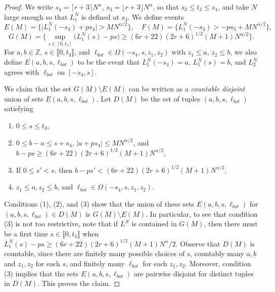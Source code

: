 \begin{proof}
	We write $s_4 = \lceil r+3 \rceil N^\alpha$, $s_3 = \lfloor r+3 \rfloor N^\alpha$, so that $s_3 \leq t_3 \leq s_4$, and take $N$ large enough so that $L_1^N$ is defined at $s_4$. We define events 
	\[
	E(M) = \Big\{\big|L_1^N(-s_4) + ps_4\big| > MN^{\alpha/2}\Big\}, \quad F(M) = \Big\{L_1^N(-s_3) > -ps_3 + MN^{\alpha/2} \Big\},
	\]
	\[
	G(M) = \Bigg\{\sup_{s\in[0,t_3]} \big(L_1^N(s) - ps \big) \geq (6r+22)(2r+6)^{1/2}(M+1)N^{\alpha/2} \Bigg\}.
	\]
	For $a,b\in\mathbb{Z}$, $s\in\llbracket 0, t_3 \rrbracket$, and $\ell_{bot}\in\Omega(-s_4,s,z_1,z_2)$ with $z_1\leq a$, $z_2\leq b$, we also define $E(a,b,s,\ell_{bot})$ to be the event that $L_1^N(-s_4) = a$, $L_1^N(s) = b$, and $L_2^N$ agrees with $\ell_{bot}$ on $[-s_4,s]$. 
	
	We claim that the set $G(M) \setminus E(M)$ can be written as a \textit{countable disjoint} union of sets $E(a,b,s,\ell_{bot})$. Let $D(M)$ be the set of tuples $(a,b,s,\ell_{bot})$ satisfying
	\begin{enumerate}[label=(\arabic*)]
		
		\item $0\leq s\leq t_3$,
		
		\item $0\leq b-a \leq s + s_4$, $|a + ps_4| \leq MN^{\alpha/2}$, and $b-ps \geq (6r+22)(2r+6)^{1/2}(M+1)N^{\alpha/2}$,
		
		\item If $0\leq s' < s$, then $b-ps' < (6r+22)(2r+6)^{1/2}(M+1)N^{\alpha/2}$,
		
		\item $z_1\leq a, z_2\leq b$, and $\ell_{bot}\in\Omega(-s_4, s, z_1, z_2)$.
		
	\end{enumerate}
	Conditions (1), (2), and (3) show that the union of these sets $E(a,b,s,\ell_{bot})$ for $(a,b,s,\ell_{bot})\in D(M)$ is $G(M)\setminus E(M)$. In particular, to see that condition (3) is not too restrictive, note that if $L^N$ is contained in $G(M)$, then there must be a first time $s\in\llbracket 0,t_3\rrbracket$ when $L_1^N(s)-ps \geq (6r+22)(2r+6)^{1/2}(M+1)N^\alpha/2$. Observe that $D(M)$ is countable, since there are finitely many possible choices of $s$, countably many $a,b$ and $z_1,z_2$ for each $s$, and finitely many $\ell_{bot}$ for each $z_1,z_2$. Moreover, condition (3) implies that the sets $E(a,b,s,\ell_{bot})$ are pairwise disjoint for distinct tuples in $D(M)$. This proves the claim.
	

\end{proof}
